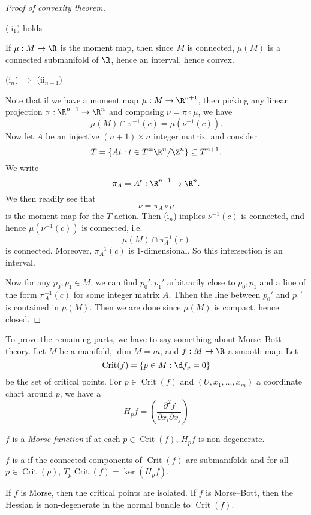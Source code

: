 \documentclass[a4paper]{article}
\DeclareMathOperator{\Crit}{Crit}
\begin{document}
\begin{proof}[Proof of convexity theorem]
  \begin{claim}
    (ii$_1$) holds
  \end{claim}
  If $\mu: M \to \R$ is the moment map, then since $M$ is connected, $\mu(M)$ is a connected submanifold of $\R$, hence an interval, hence convex.

  \begin{claim}
    (i$_n$) $\Rightarrow$ (ii$_{n + 1}$)
  \end{claim}
  Note that if we have a moment map $\mu: M \to \R^{n + 1}$, then picking any linear projection $\pi: \R^{n + 1} \to \R^n$ and composing $\nu = \pi \circ \mu$, we have
  \[
    \mu(M) \cap \pi^{-1}(c) = \mu(\nu^{-1}(c)).
  \]
  Now let $A$ be an injective $(n + 1) \times n$ integer matrix, and consider
  \[
    T = \{At : t \in T^ = \R^n/\Z^n\} \subseteq T^{n + 1}.
  \]
  We write
  \[
    \pi_A = A^t:\R^{n + 1} \to \R^n.
  \]
  We then readily see that
  \[
    \nu = \pi_{A} \circ \mu
  \]
  is the moment map for the $T$-action. Then (i$_n$) implies $\nu^{-1}(c)$ is connected, and hence $\mu(\nu^{-1}(c))$ is connected, i.e.
  \[
    \mu(M) \cap \pi_A^{-1}(c)
  \]
  is connected. Moreover, $\pi_A^{-1}(c)$ is $1$-dimensional. So this intersection is an interval.

  Now for any $p_0, p_1 \in M$, we can find $p_0', p_1'$ arbitrarily close to $p_0, p_1$ and a line of the form $\pi_A^{-1}(c)$ for some integer matrix $A$. Thhen the line between $p_0'$ and $p_1'$ is contained in $\mu(M)$. Then we are done since $\mu(M)$ is compact, hence closed.
\end{proof}

To prove the remaining parts, we have to say something about Morse--Bott theory. Let $M$ be a manifold, $\dim M = m$, and $f: M \to \R$ a smooth map. Let
\[
  \Crit(f) = \{p \in M: \d f_p = 0\}
\]
be the set of critical points. For $p \in \Crit(f)$ and $(U, x_1, \ldots, x_m)$ a coordinate chart around $p$, we have a 
\[
  H_pf = \left( \frac{\partial^2 f}{\partial x_i \partial x_j}\right)
\]
\begin{defi}
  $f$ is a \emph{Morse function} if at each $p \in \Crit(f)$, $H_p f$ is non-degenerate.

  $f$ is a  if the connected components of $\Crit(f)$ are submanifolds and for all $p \in \Crit(p)$, $T_p \Crit(f) = \ker (H_p f)$.
\end{defi}
If $f$ is Morse, then the critical points are isolated. If $f$ is Morse--Bott, then the Hessian is non-degenerate in the normal bundle to $\Crit(f)$.
\end{document}
